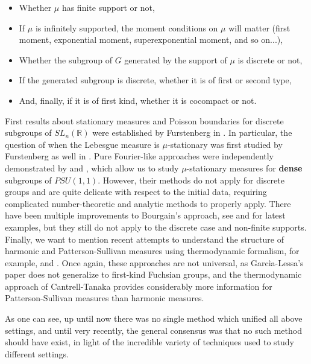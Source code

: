\documentclass[11pt]{article}
\begin{document}
\begin{itemize}
	\item Whether $\mu$ has finite support or not,
	\item If $\mu$ is infinitely supported, the moment conditions on $\mu$ will matter (first moment, exponential moment, superexponential moment, and so on...),
	\item Whether the subgroup of $G$ generated by the support of $\mu$ is discrete or not,
	\item If the generated subgroup is discrete, whether it is of first or second type,
	\item And, finally, if it is of first kind, whether it is cocompact or not.
\end{itemize}

First results about stationary measures and Poisson boundaries for discrete subgroups of $SL_n(\mathbb{R})$ were established by Furstenberg in \cite{furstenberg1963noncommuting}. In particular, the question of when the Lebesgue measure is $\mu$-stationary was first studied by Furstenberg as well in \cite{furstenberg71}. Pure Fourier-like approaches were independently demonstrated by \cite{Bourgain2012} and \cite{MR2969625}, which allow us to study $\mu$-stationary measures for \textbf{dense} subgroups of $PSU(1,1)$. However, their methods do not apply for discrete groups and are quite delicate with respect to the initial data, requiring complicated number-theoretic and analytic methods to properly apply. There have been multiple improvements to Bourgain's approach, see \cite{lequen2022absolutely} and \cite{kittle2023absolutely} for latest examples, but they still do not apply to the discrete case and non-finite supports. Finally, we want to mention recent attempts to understand the structure of harmonic and Patterson-Sullivan measures using thermodynamic formalism, for example, \cite{garcía2023dimension} and \cite{cantrell2022invariant}. Once again, these approaches are not universal, as Garc\`{i}a-Lessa's paper does not generalize to first-kind Fuchsian groups, and the thermodynamic approach of Cantrell-Tanaka provides considerably more information for Patterson-Sullivan measures than harmonic measures.

As one can see, up until now there was no single method which unified all above settings, and until very recently, the general consensus was that no such method should have exist, in light of the incredible variety of techniques used to study different settings. 
\end{document}
